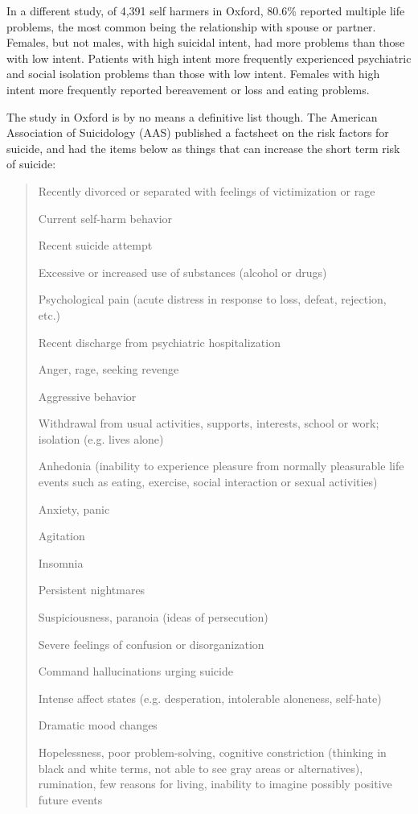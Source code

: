 \documentclass[12pt]{article}
\begin{document}
In a different study, of 4,391 self harmers in Oxford, 80.6\% reported multiple life problems, the most common being the relationship with spouse or partner. Females, but not males, with high suicidal intent, had more problems than those with low intent. Patients with high intent more frequently experienced psychiatric and social isolation problems than those with low intent. Females with high intent more frequently reported bereavement or loss and eating problems.

The study in Oxford is by no means a definitive list though. The American Association of Suicidology (AAS) published a factsheet on the risk factors for suicide, and had the items below as things that can increase the short term risk of suicide:

\begin{verse}
Recently divorced or separated with feelings of victimization or rage

Current self-harm behavior

Recent suicide attempt

Excessive or increased use of substances (alcohol or drugs)

Psychological pain (acute distress in response to loss, defeat, rejection, etc.)

Recent discharge from psychiatric hospitalization

Anger, rage, seeking revenge

Aggressive behavior

Withdrawal from usual activities, supports, interests, school or work; isolation (e.g. lives alone)

Anhedonia (inability to experience pleasure from normally pleasurable life events such as eating, exercise, social interaction or sexual activities)

Anxiety, panic

Agitation

Insomnia

Persistent nightmares

Suspiciousness, paranoia (ideas of persecution)

Severe feelings of confusion or disorganization

Command hallucinations urging suicide

Intense affect states (e.g. desperation, intolerable aloneness, self-hate)

Dramatic mood changes

Hopelessness, poor problem-solving, cognitive constriction (thinking in black and white terms, not able to see gray areas or alternatives), rumination, few reasons for living, inability to imagine possibly positive future events


\end{verse}
\end{document}
